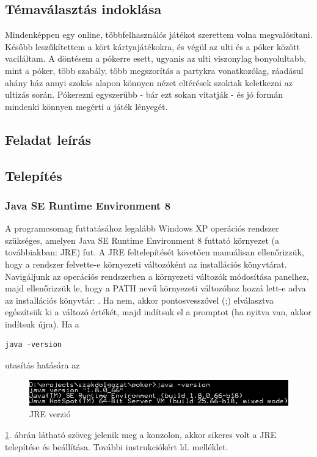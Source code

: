 \subsection{Témaválasztás indoklása}
Mindenképpen egy online, többfelhasználós játékot szerettem volna megvalósítani. Később leszűkítettem a kört kártyajátékokra, és végül az ulti és a póker között vaciláltam. A döntésem a pókerre esett, ugyanis az ulti viszonylag bonyolultabb, mint a póker, több szabály, több megszorítás a partykra vonatkozólag, ráadásul ahány ház annyi szokás alapon könnyen nézet eltérések szoktak keletkezni az ultizás során. Pókerezni egyszerűbb - bár ezt sokan vitatják - és jó formán mindenki könnyen megérti a játék lényegét.

\subsection{Feladat leírás}

\subsection{Telepítés}
\subsubsection{Java SE Runtime Environment 8}
A programcsomag futtatásához legalább Windows XP operációs rendszer szükséges, amelyen Java SE Runtime Environment 8 futtató környezet \cite{jresite} (a továbbiakban: JRE) fut. A JRE feltelepítését követően manuálisan ellenőrizzük, hogy a rendszer felvette-e környezeti változóként az installációs könyvtárat. Navigáljunk az operációs rendszerben a környezeti változók módosítása panelhez, majd ellenőrizzük le, hogy a PATH nevű környezeti változóhoz hozzá lett-e adva az installációs könyvtár: . 
Ha nem, akkor pontosvesszővel (;) elválasztva egészítsük ki a változó értékét, majd indítsuk el a promptot (ha nyitva van, akkor indítsuk újra).
Ha a
\begin{verbatim}
java -version
\end{verbatim}
utasítás hatására az 
\begin{figure}[h!]
  \caption{JRE verzió}
  \label{fig:jre_version}
  \centering
    \includegraphics{user-documentation/images/java_version.jpg}
\end{figure}
 \ref{fig:jre_version}. ábrán látható szöveg jelenik meg a konzolon, akkor sikeres volt a JRE telepítése és beállítása. További instrukciókért ld. melléklet.
 
